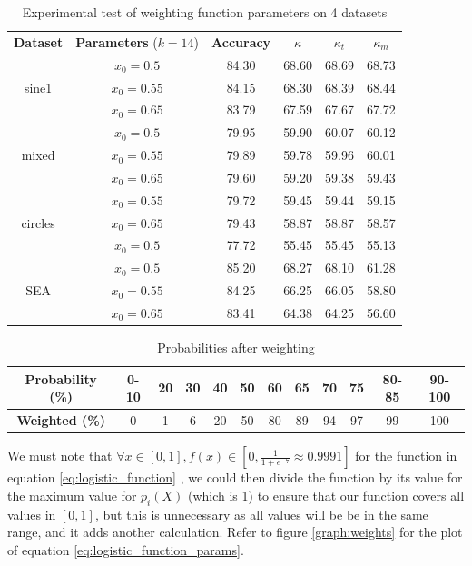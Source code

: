 \begin{table}
\caption{\label{table:weighting_experimental_test_all_datasets}Experimental test of weighting function parameters on 4 datasets}
\centering
\begin{tabular}{|c|c|c|c|c|c|}
\hline
\textbf{Dataset} & \textbf{Parameters} ($k=14$) & \textbf{Accuracy} & \textbf{$\kappa$} & \textbf{$\kappa_t$} & \textbf{$\kappa_m$} \\ \hhline{======}
& $x_0=0.5$	&	84.30	&	68.60	&	68.69	&	68.73\\ \cline{2-6}
sine1 & $x_0=0.55$	&	84.15	&	68.30	&	68.39	&	68.44\\ \cline{2-6}
 & $x_0=0.65$	&	83.79	&	67.59	&	67.67	&	67.72\\ \hhline{======}
 & $x_0=0.5$	&	79.95	&	59.90	&	60.07	&	60.12\\ \cline{2-6}
mixed & $x_0=0.55$	&	79.89	&	59.78	&	59.96	&	60.01\\ \cline{2-6}
 & $x_0=0.65$	&	79.60	&	59.20	&	59.38	&	59.43\\ \hhline{======}
 & $x_0=0.55$	&	79.72	&	59.45	&	59.44	&	59.15\\ \cline{2-6}
circles & $x_0=0.65$	&	79.43	&	58.87	&	58.87	&	58.57\\ \cline{2-6}
 & $x_0=0.5$	&	77.72	&	55.45	&	55.45	&	55.13\\ \hhline{======}
 & $x_0=0.5$	&	85.20	&	68.27	&	68.10	&	61.28\\ \cline{2-6}
SEA & $x_0=0.55$	&	84.25	&	66.25	&	66.05	&	58.80\\ \cline{2-6}
 & $x_0=0.65$	&	83.41	&	64.38	&	64.25	&	56.60\\ \hline
\end{tabular}
\end{table}

\begin{table}[]
\caption{\label{table:weight_probabilities}Probabilities after weighting}
\centering
\begin{tabular}{|c|c|c|c|c|c|c|c|c|c|c|c|}\\ \hhline{============}
\textbf{Probability (\%)} & 0-10&20&30&40&50&60&65&70&75&80-85&90-100 \\ \hline
\textbf{Weighted (\%)} & 0&1&6&20&50&80&89&94&97&99&100 \\ \hline
\end{tabular}
\end{table}

We must note that $\forall x \in [0,1], f(x) \in [0, \frac{1}{1+e^{-7}}\approx 0.9991]$ for the function in equation \ref{eq:logistic_function} , we could then divide the function by its value for the maximum value for $p_i(X)$ (which is 1) to ensure that our function covers all values in $[0,1]$, but this is unnecessary as all values will be be in the same range, and it adds another calculation.
Refer to figure \ref{graph:weights} for the plot of equation \ref{eq:logistic_function_params}.


